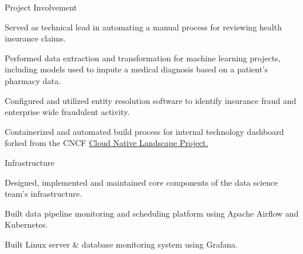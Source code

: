 \documentclass[]{deedy-resume-openfont}
\begin{document}
\vspace{\topsep} 
\begin{tightemize}
\item Project Involvement
    \vspace{\topsep}
    \begin{tightemize}
    \item Served as technical lead in automating a manual process for reviewing health insurance claims.
    \item Performed data extraction and transformation for machine learning projects, including models used to impute a medical diagnosis based on a patient's pharmacy data.
    \item Configured and utilized entity resolution software to identify insurance fraud and enterprise wide fraudulent activity.
    \item Containerized and automated build process for internal technology dashboard forked from the CNCF \href{https://github.com/cncf/landscape}{Cloud Native Landscape Project.}
    \end{tightemize}
    \vspace{\topsep}
\item Infrastructure
    \vspace{\topsep}
    \begin{tightemize}
    \item Designed, implemented and maintained core components of the data science team's infrastructure.
    \item Built data pipeline monitoring and scheduling platform using Apache Airflow and Kubernetes.
    \item Built Linux server \& database monitoring system using Grafana.

\end{tightemize}
\end{tightemize}
\end{document}
